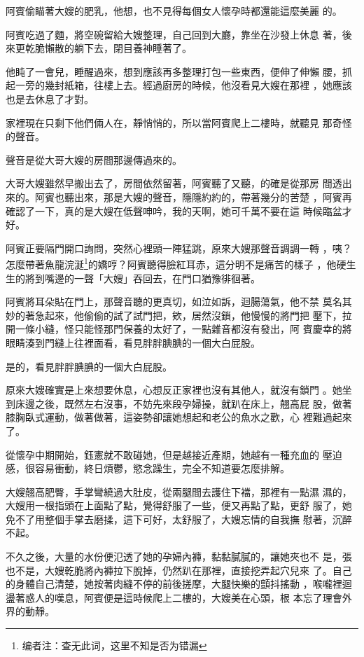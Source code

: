 阿賓偷瞄著大嫂的肥乳，他想，也不見得每個女人懷孕時都還能這麼美麗
的。

阿賓吃過了麵，將空碗留給大嫂整理，自己回到大廳，靠坐在沙發上休息
著，後來更乾脆懶散的躺下去，閉目養神睡著了。

他盹了一會兒，睡醒過來，想到應該再多整理打包一些東西，便伸了伸懶
腰，抓起一旁的幾封紙箱，往樓上去。經過廚房的時候，他沒看見大嫂在那裡
，她應該也是去休息了才對。

家裡現在只剩下他們倆人在，靜悄悄的，所以當阿賓爬上二樓時，就聽見
那奇怪的聲音。

聲音是從大哥大嫂的房間那邊傳過來的。

大哥大嫂雖然早搬出去了，房間依然留著，阿賓聽了又聽，的確是從那房
間透出來的。阿賓也聽出來，那是大嫂的聲音，隱隱約約的，帶著幾分的苦楚
，阿賓再確認了一下，真的是大嫂在低聲呻吟，我的天啊，她可千萬不要在這
時候臨盆才好。

阿賓正要隔門開口詢問，突然心裡頭一陣猛跳，原來大嫂那聲音調調一轉
，咦？怎麼帶著魚龍浣涎\footnote{编者注：查无此词，这里不知是否为错漏}的嬌哼？阿賓聽得臉紅耳赤，這分明不是痛苦的樣子
，他硬生生的將到嘴邊的一聲「大嫂」吞回去，在門口猶豫徘徊著。

阿賓將耳朵貼在門上，那聲音聽的更真切，如泣如訴，迴腸蕩氣，他不禁
莫名其妙的著急起來，他偷偷的試了試門把，欸，居然沒鎖，他慢慢的將門把
壓下，拉開一條小縫，怪只能怪那門保養的太好了，一點雜音都沒有發出，阿
賓慶幸的將眼睛湊到門縫上往裡面看，看見胖胖腆腆的一個大白屁股。

是的，看見胖胖腆腆的一個大白屁股。

原來大嫂確實是上來想要休息，心想反正家裡也沒有其他人，就沒有鎖門
。她坐到床邊之後，既然左右沒事，不妨先來段孕婦操，就趴在床上，翹高屁
股，做著膝胸臥式運動，做著做著，這姿勢卻讓她想起和老公的魚水之歡，心
裡難過起來了。

從懷孕中期開始，鈺憲就不敢碰她，但是越接近產期，她越有一種充血的
壓迫感，很容易衝動，終日煩鬱，慾念躁生，完全不知道要怎麼排解。

大嫂翹高肥臀，手掌彎繞過大肚皮，從兩腿間去護住下襠，那裡有一點濕
濕的，大嫂用一根指頭在上面點了點，覺得舒服了一些，便又再點了點，更舒
服了，她免不了用整個手掌去磨揉，這下可好，太舒服了，大嫂忘情的自我撫
慰著，沉醉不起。

不久之後，大量的水份便氾透了她的孕婦內褲，黏黏膩膩的，讓她夾也不
是，張也不是，大嫂乾脆將內褲拉下脫掉，仍然趴在那裡，直接挖弄起穴兒來
了。自己的身體自己清楚，她按著肉縫不停的前後搓摩，大腿快樂的顫抖搖動
，喉嚨裡迴盪著惑人的嘆息，阿賓便是這時候爬上二樓的，大嫂美在心頭，根
本忘了理會外界的動靜。


